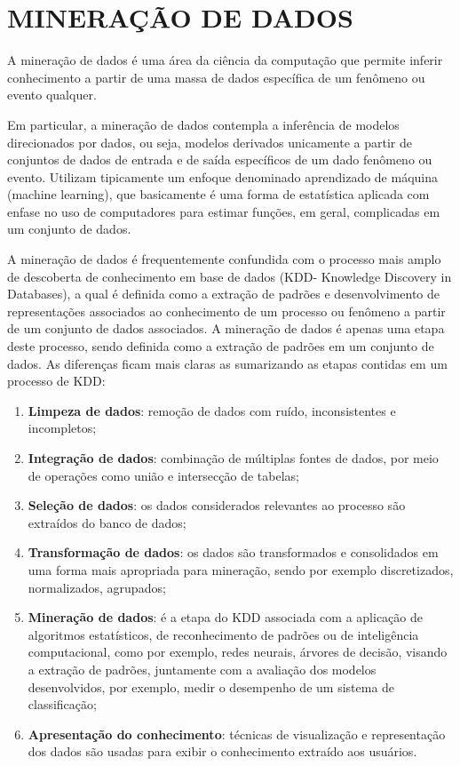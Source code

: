 \chapter{MINERAÇÃO DE DADOS}

A mineração de dados é uma área da ciência da computação que permite inferir conhecimento a partir de uma massa de dados específica de um fenômeno ou evento qualquer.


Em particular, a mineração de dados contempla a inferência de modelos direcionados por dados, ou seja, modelos derivados unicamente a partir de conjuntos de dados de entrada e de saída específicos de um dado fenômeno ou evento. Utilizam tipicamente um enfoque denominado aprendizado de máquina (machine learning), que basicamente é uma forma de estatística aplicada com enfase no uso de computadores para estimar funções, em geral, complicadas em um conjunto de dados.

A mineração de dados é frequentemente confundida com o processo mais amplo de descoberta de conhecimento em base de dados (KDD- Knowledge Discovery in Databases), a qual é definida como a extração de padrões e desenvolvimento de representações associados ao conhecimento de um processo ou fenômeno a partir de um conjunto de dados associados. A mineração de dados é apenas uma etapa deste processo, sendo definida como a extração de padrões em um conjunto de dados. As diferenças ficam mais claras as sumarizando as etapas contidas em um processo de KDD:

\begin{enumerate}
\item {\bf Limpeza de dados}: remoção de dados com ruído, inconsistentes e incompletos;
\item {\bf Integração de dados}: combinação de múltiplas fontes de dados, por meio de operações como união e intersecção de tabelas;
\item {\bf Seleção de dados}: os dados considerados relevantes ao processo são extraídos do banco de dados;
\item {\bf Transformação de dados}: os dados são transformados e consolidados em uma forma mais apropriada para mineração, sendo por exemplo discretizados, normalizados, agrupados;
\item {\bf Mineração de dados}: é a etapa do KDD associada com a aplicação de algoritmos estatísticos, de reconhecimento de padrões ou de inteligência computacional, como por exemplo, redes neurais, árvores de decisão, visando a extração de padrões, juntamente com a avaliação dos modelos desenvolvidos, por exemplo, medir o desempenho de um sistema de classificação;
\item {\bf Apresentação do conhecimento}: técnicas de visualização e representação dos dados são usadas para exibir o conhecimento extraído aos usuários.
\end{enumerate} 

